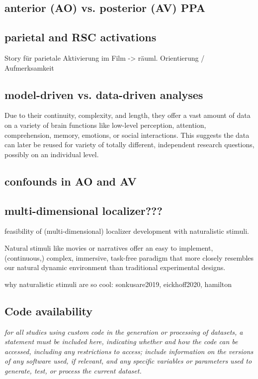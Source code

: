 \documentclass[english]{article}
\begin{document}
\subsection{anterior (AO) vs. posterior (AV) PPA}

\subsection{parietal and RSC activations} Story für parietale Aktivierung im
Film -> räuml. Orientierung / Aufmerksamkeit

\subsection{model-driven vs. data-driven analyses} Due to their continuity,
complexity, and length, they offer a vast amount of data on a variety of brain
functions like low-level perception, attention, comprehension, memory, emotions,
or social interactions. This suggests the data can later be reused for variety
of totally different, independent research questions, possibly on an individual
level.

\subsection{confounds in AO and AV}

\subsection{multi-dimensional localizer???}
feasibility of (multi-dimensional) localizer development with naturalistic
stimuli.

Natural stimuli like movies \citep{hasson2008neurocinematics,
sonkusare2019naturalistic} or narratives \citep{honey2012not,
lerner2011topographic, silbert2014coupled} offer an easy to implement,
(continuous,) complex, immersive, task-free paradigm that more closely resembles
our natural dynamic environment than traditional experimental designs.

why naturalistic stimuli are so cool: sonkusare2019, eickhoff2020, hamilton


\subsection*{Code availability}
\emph{for all studies using custom code in the generation or processing of datasets,
a statement must be included here, indicating whether and how the code can be
accessed, including any restrictions to access; include information on the versions
of any software used, if relevant, and any specific variables or parameters used to
generate, test, or process the current dataset. }
\end{document}

